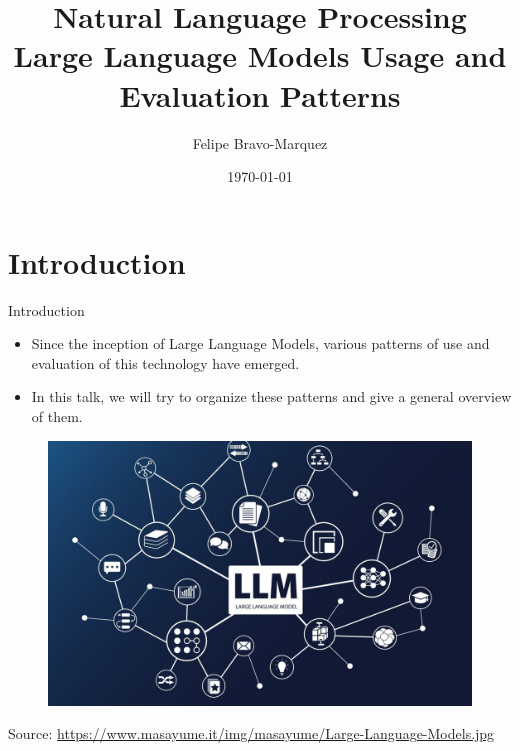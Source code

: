 \documentclass[handout]{beamer}
\title{Natural Language Processing \\ Large Language Models Usage and Evaluation Patterns}
\author[Felipe Bravo Márquez]{\footnotesize
 \textcolor[rgb]{0.00,0.00,1.00}{Felipe Bravo-Marquez}}
\date{\today}
\begin{document}
\begin{frame}
\titlepage


\end{frame}



\section{Introduction}
\begin{frame}{Introduction}
\begin{scriptsize}
\begin{itemize}
\item Since the inception of Large Language Models, various patterns of use and evaluation of this technology have emerged.
\item In this talk, we will try to organize these patterns and give a general overview of them.
\end{itemize}

 \begin{figure}[h]
        	\includegraphics[scale = 0.2]{pics/Large-Language-Models.jpg}
        \end{figure}
Source: \url{https://www.masayume.it/img/masayume/Large-Language-Models.jpg}
\end{scriptsize}
\end{frame}
\end{document}
